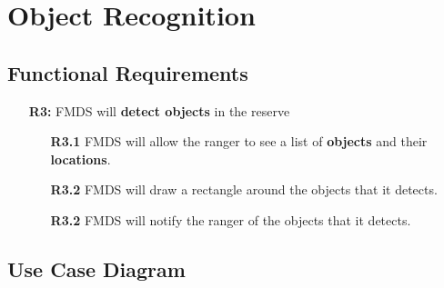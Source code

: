 \section{ Object Recognition }
\subsection{Functional Requirements}
	\begin{flushleft}
		\begin{itemize}
			\item  [\textbf{R3:}] FMDS will \textbf{detect objects} in the reserve

				\begin{itemize}
					\item [\textbf{R3.1}] FMDS will allow the ranger to see a list of \textbf{objects} and their \textbf{locations}.
					\item [\textbf{R3.2}] FMDS will draw a rectangle around the objects that it detects.
					\item [\textbf{R3.2}] FMDS will notify the ranger of the objects that it detects.
				\end{itemize}
		\end{itemize}
	\end{flushleft}

\subsection{Use Case Diagram}


